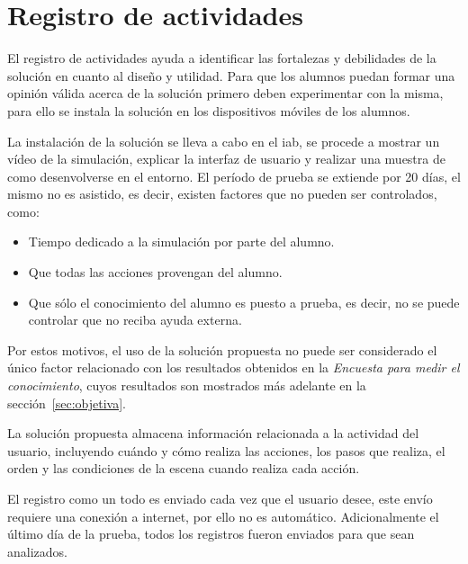 
\section{Registro de actividades}
\label{sec:registro}

El registro de actividades ayuda a identificar las  fortalezas y debilidades 
de la solución en cuanto al diseño y utilidad. Para que los alumnos puedan formar 
una opinión válida acerca de la solución primero 
deben experimentar con la misma, para ello se instala la solución en los dispositivos 
móviles de los alumnos.

La instalación de la solución se lleva a cabo en el \Gls{iab}, se procede 
a mostrar un vídeo de la simulación, explicar la interfaz de usuario y realizar una muestra 
de como desenvolverse en el entorno. El período de prueba se extiende por 20 días, el mismo no es
asistido, es decir, existen factores que no pueden ser controlados, como:

\begin{itemize}
    \item Tiempo dedicado a la simulación por parte del alumno.
    \item Que todas las acciones provengan del alumno.
    \item Que sólo el conocimiento del alumno es puesto a prueba, es decir, no
        se puede controlar que no reciba ayuda externa.
\end{itemize}

Por estos motivos, el uso de la solución propuesta no puede ser considerado
el único factor relacionado con los resultados obtenidos en la \emph{Encuesta para medir el 
conocimiento}, cuyos resultados son mostrados más adelante en la sección~\ref{sec:objetiva}.

La solución propuesta almacena información relacionada a la actividad del
usuario, incluyendo cuándo y cómo realiza las acciones, los pasos que realiza,
el orden y las condiciones de la escena cuando realiza cada acción.

El registro como un todo es enviado cada vez que el usuario desee, este envío
requiere una conexión a internet, por ello no es automático. Adicionalmente el
último día de la prueba, todos los registros fueron enviados para que sean
analizados.



